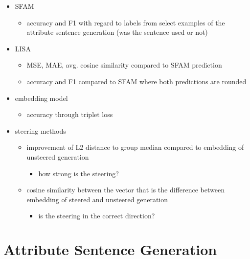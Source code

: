 \begin{itemize}
  \item SFAM
        \begin{itemize}
          \item accuracy and F1 with regard to labels from select examples of the attribute sentence generation (was the sentence used or not)
        \end{itemize}
  \item LISA
        \begin{itemize}
          \item MSE, MAE, avg. cosine similarity compared to SFAM prediction
          \item accuracy and F1 compared to SFAM where both predictions are rounded
        \end{itemize}
  \item embedding model
        \begin{itemize}
          \item accuracy through triplet loss
        \end{itemize}
  \item steering methods
        \begin{itemize}
          \item improvement of L2 distance to group median compared to embedding of unsteered generation
                \begin{itemize}
                  \item how strong is the steering?
                \end{itemize}
          \item cosine similarity between the vector that is the difference between embedding of steered and unsteered generation
                \begin{itemize}
                  \item is the steering in the correct direction?
                \end{itemize}
        \end{itemize}
\end{itemize}


\section{Attribute Sentence Generation}
\label{sec:approach:attributeSentenceGeneration}

